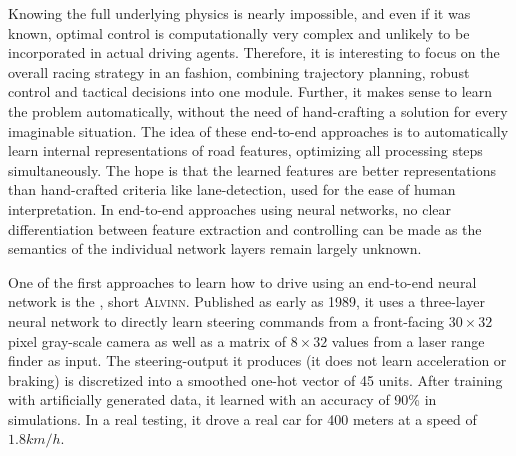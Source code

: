 Knowing the full underlying physics is nearly impossible, and even if it was known, optimal control is computationally very complex and unlikely to be incorporated in actual driving agents. Therefore, it is interesting to focus on the overall racing strategy in an  fashion, combining trajectory planning, robust control and tactical decisions into one module. Further, it makes sense to learn the problem automatically, without the need of hand-crafting a solution for every imaginable situation. The idea of these end-to-end approaches is to automatically learn internal representations of road features, optimizing all processing steps simultaneously. The hope is that the learned features are better representations than hand-crafted criteria like lane-detection, used for the ease of human interpretation. In end-to-end approaches using neural networks, no clear differentiation between feature extraction and controlling can be made as the semantics of the individual network layers remain largely unknown.

One of the first approaches to learn how to drive using an end-to-end neural network is the , short \textsc{Alvinn}\cite{pomerleau_alvinn:_1989}. Published as early as 1989, it uses a three-layer neural network to directly learn steering commands from a front-facing $30\times32$ pixel gray-scale camera as well as a matrix of $8\times32$ values from a laser range finder as input. The steering-output it produces (it does not learn acceleration or braking) is discretized into a smoothed one-hot vector of 45 units. After training with artificially generated data, it learned with an accuracy of 90\% in simulations. In a real testing, it drove a real car for 400 meters at a speed of $1.8 km/h$. 


